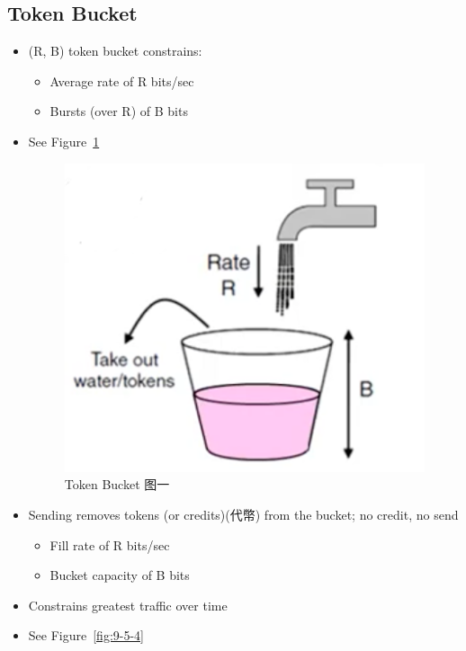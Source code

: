 \documentclass[12pt]{ctexart}   %
\begin{document}
	\subsection{Token Bucket}
	\begin{itemize}
		\item (R, B) token bucket constrains:
		\begin{itemize}
			\item Average rate of R bits/sec
			\item Bursts (over R) of B bits
		\end{itemize}
		\item See Figure~\ref{fig:9-5-3}
		  
		 \begin{figure}[h!] %
		\centering
		 \includegraphics[scale=0.7]{images/9-5-3}
		\caption{ Token Bucket 图一}
		 \label{fig:9-5-3}
		 \end{figure}
		 
		 \item Sending removes tokens (or credits)(代幣) from the bucket; no credit, no send
		 \begin{itemize}
		 	\item Fill rate of R bits/sec
		 	\item Bucket capacity of B bits
		 \end{itemize}
		 
		 \item Constrains greatest traffic over time
		 \item See Figure~\ref{fig:9-5-4}
		  

\end{itemize}
\end{document}
